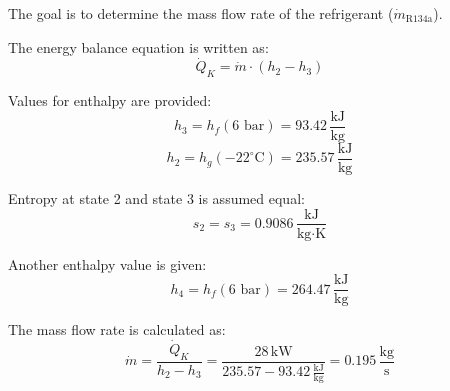 The goal is to determine the mass flow rate of the refrigerant (\( \dot{m}_{\text{R134a}} \)).  

The energy balance equation is written as:  
\[
\dot{Q}_K = \dot{m} \cdot (h_2 - h_3)
\]  

Values for enthalpy are provided:  
\[
h_3 = h_f(\text{6 bar}) = 93.42 \, \frac{\text{kJ}}{\text{kg}}
\]  
\[
h_2 = h_g(-22^\circ\text{C}) = 235.57 \, \frac{\text{kJ}}{\text{kg}}
\]  

Entropy at state 2 and state 3 is assumed equal:  
\[
s_2 = s_3 = 0.9086 \, \frac{\text{kJ}}{\text{kg·K}}
\]  

Another enthalpy value is given:  
\[
h_4 = h_f(\text{6 bar}) = 264.47 \, \frac{\text{kJ}}{\text{kg}}
\]  

The mass flow rate is calculated as:  
\[
\dot{m} = \frac{\dot{Q}_K}{h_2 - h_3} = \frac{28 \, \text{kW}}{235.57 - 93.42 \, \frac{\text{kJ}}{\text{kg}}} = 0.195 \, \frac{\text{kg}}{\text{s}}
\]